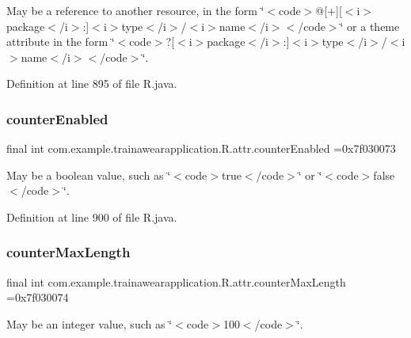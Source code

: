 May be a reference to another resource, in the form \char`\"{}$<$code$>$@\mbox{[}+\mbox{]}\mbox{[}$<$i$>$package$<$/i$>$\+:\mbox{]}$<$i$>$type$<$/i$>$/$<$i$>$name$<$/i$>$$<$/code$>$\char`\"{} or a theme attribute in the form \char`\"{}$<$code$>$?\mbox{[}$<$i$>$package$<$/i$>$\+:\mbox{]}$<$i$>$type$<$/i$>$/$<$i$>$name$<$/i$>$$<$/code$>$\char`\"{}. 

Definition at line 895 of file R.\+java.

\mbox{\label{classcom_1_1example_1_1trainawearapplication_1_1_r_1_1attr_a8e75f59b3b2d482dc5e6c6546e206cb0}} 
\subsubsection{\texorpdfstring{counterEnabled}{counterEnabled}}
{\footnotesize\ttfamily final int com.\+example.\+trainawearapplication.\+R.\+attr.\+counter\+Enabled =0x7f030073\hspace{0.3cm}{\ttfamily [static]}}

May be a boolean value, such as \char`\"{}$<$code$>$true$<$/code$>$\char`\"{} or \char`\"{}$<$code$>$false$<$/code$>$\char`\"{}. 

Definition at line 900 of file R.\+java.

\mbox{\label{classcom_1_1example_1_1trainawearapplication_1_1_r_1_1attr_a738a1bcf753c9d00c7d198edfc8ffd96}} 
\subsubsection{\texorpdfstring{counterMaxLength}{counterMaxLength}}
{\footnotesize\ttfamily final int com.\+example.\+trainawearapplication.\+R.\+attr.\+counter\+Max\+Length =0x7f030074\hspace{0.3cm}{\ttfamily [static]}}

May be an integer value, such as \char`\"{}$<$code$>$100$<$/code$>$\char`\"{}. 

